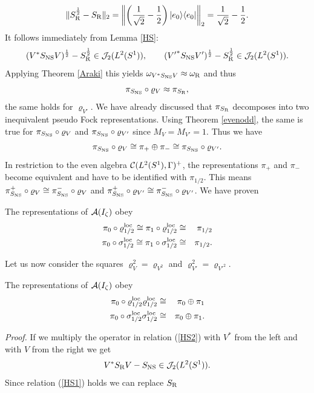 \documentclass[10pt,a4paper]{article}
\begin{document}
\[ \|S_{\rm R}^\frac{1}{2}-S_{\rm R}\|_2 = \left\| \left(
\frac{1}{\sqrt{2}}-\frac{1}{2}\right) |e_0\rangle\langle
e_0| \right\|_2 = \frac{1}{\sqrt{2}}-\frac{1}{2}.\]
It follows immediately from Lemma \ref{HS}:
\[ (V^*S_{\rm NS}V)^\frac{1}{2}-S_{\rm R}^\frac{1}{2} \in
{\cal J}_2(L^2(S^1)), \qquad
({V'}^*S_{\rm NS}V')^\frac{1}{2}-S_{\rm R}^\frac{1}{2} \in
{\cal J}_2(L^2(S^1)). \]
Applying Theorem \ref{Araki} this yields
$\omega_{V^*S_{\rm NS}V}\approx\omega_{\rm R}$ and thus
\[ \pi_{S_{\rm NS}} \circ \varrho_V \approx \pi_{S_{\rm R}},\]
the same holds for $\varrho_{V'}$.
We have already discussed that $\pi_{S_{\rm R}}$
decomposes into two inequivalent pseudo Fock
representations. Using Theorem \ref{evenodd}, the
same is true for $\pi_{S_{\rm NS}}\circ\varrho_V$ and
$\pi_{S_{\rm NS}}\circ\varrho_{V'}$ since
$M_V=M_{V'}=1$. Thus we have
\[ \pi_{S_{\rm NS}}\circ\varrho_V \cong \pi_+ \oplus
\pi_- \cong \pi_{S_{\rm NS}}\circ\varrho_{V'}. \]
In restriction to the even algebra
${\cal C}(L^2(S^1),\Gamma)^+$, the representations
$\pi_+$ and $\pi_-$ become equivalent and have
to be identified with $\pi_{1/2}$. This means
$\pi_{S_{\rm NS}}^+\circ\varrho_V\cong
\pi_{S_{\rm NS}}^-\circ\varrho_V$ and
$\pi_{S_{\rm NS}}^+\circ\varrho_{V'}\cong
\pi_{S_{\rm NS}}^-\circ\varrho_{V'}$. We have
proven
\begin{theorem}
\label{1/2loc}
The representations of ${\cal A}(I_\zeta)$ obey
\begin{eqnarray}
\pi_0\circ\varrho_{1/2}^{\rm loc} \cong
\pi_1\circ\varrho_{1/2}^{\rm loc} &\cong& \pi_{1/2}\\
\pi_0\circ\sigma_{1/2}^{\rm loc} \cong
\pi_1\circ\sigma_{1/2}^{\rm loc} &\cong& \pi_{1/2}.
\end{eqnarray}
\end{theorem}
Let us now consider the squares $\varrho_V^2=\varrho_{V^2}$
and $\varrho_{V'}^2=\varrho_{{V'}^2}$.
\begin{proposition}
\label{square}
The representations of ${\cal A}(I_\zeta)$ obey
\begin{eqnarray}
\pi_0\circ\varrho_{1/2}^{\rm loc}\varrho_{1/2}^{\rm loc}
&\cong& \pi_0 \oplus \pi_1 \\
\pi_0\circ\sigma_{1/2}^{\rm loc}\sigma_{1/2}^{\rm loc}
&\cong& \pi_0 \oplus \pi_1.
\end{eqnarray}
\end{proposition}
{\it Proof.} If we multiply the operator in relation
(\ref{HS2}) with $V^*$ from the left and with $V$ from the
right we get
\[ V^*S_{\rm R}V-S_{\rm NS}\in{\cal J}_2(L^2(S^1)). \]
Since relation (\ref{HS1}) holds we can replace $S_{\rm R}$
\end{document}
